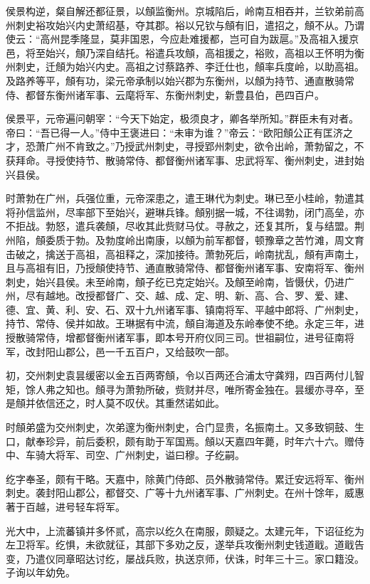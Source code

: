 \documentclass[]{article}
\begin{document}
侯景构逆，粲自解还都征景，以頠监衡州。京城陷后，岭南互相吞并，兰钦弟前高州刺史裕攻始兴内史萧绍基，夺其郡。裕以兄钦与頠有旧，遣招之，頠不从。乃谓使云：``高州昆季隆显，莫非国恩，今应赴难援都，岂可自为跋扈。''及高祖入援京邑，将至始兴，頠乃深自结托。裕遣兵攻頠，高祖援之，裕败，高祖以王怀明为衡州刺史，迁頠为始兴内史。高祖之讨蔡路养、李迁仕也，頠率兵度岭，以助高祖。及路养等平，頠有功，梁元帝承制以始兴郡为东衡州，以頠为持节、通直散骑常侍、都督东衡州诸军事、云麾将军、东衡州刺史，新豊县伯，邑四百户。

侯景平，元帝遍问朝宰：``今天下始定，极须良才，卿各举所知。''群臣未有对者。帝曰：``吾已得一人。''侍中王褒进曰：``未审为谁？''帝云：``欧阳頠公正有匡济之才，恐萧广州不肯致之。''乃授武州刺史，寻授郢州刺史，欲令出岭，萧勃留之，不获拜命。寻授使持节、散骑常侍、都督衡州诸军事、忠武将军、衡州刺史，进封始兴县侯。

时萧勃在广州，兵强位重，元帝深患之，遣王琳代为刺史。琳已至小桂岭，勃遣其将孙信监州，尽率部下至始兴，避琳兵锋。頠别据一城，不往谒勃，闭门高垒，亦不拒战。勃怒，遣兵袭頠，尽收其此赀财马仗。寻赦之，还复其所，复与结盟。荆州陷，頠委质于勃。及勃度岭出南康，以頠为前军都督，顿豫章之苦竹滩，周文育击破之，擒送于高祖，高祖释之，深加接待。萧勃死后，岭南扰乱，頠有声南土，且与高祖有旧，乃授頠使持节、通直散骑常侍、都督衡州诸军事、安南将军、衡州刺史，始兴县侯。未至岭南，頠子纥已克定始兴。及頠至岭南，皆慑伏，仍进广州，尽有越地。改授都督广、交、越、成、定、明、新、高、合、罗、爱、建、德、宜、黄、利、安、石、双十九州诸军事、镇南将军、平越中郎将、广州刺史，持节、常侍、侯并如故。王琳据有中流，頠自海道及东岭奉使不绝。永定三年，进授散骑常侍，增都督衡州诸军事，即本号开府仪同三司。世祖嗣位，进号征南将军，改封阳山郡公，邑一千五百户，又给鼓吹一部。

初，交州刺史袁昙缓密以金五百两寄頠，令以百两还合浦太守龚翙，四百两付儿智矩，馀人弗之知也。頠寻为萧勃所破，赀财并尽，唯所寄金独在。昙缓亦寻卒，至是頠并依信还之，时人莫不叹伏。其重然诺如此。

时頠弟盛为交州刺史，次弟邃为衡州刺史，合门显贵，名振南土。又多致铜鼓、生口，献奉珍异，前后委积，颇有助于军国焉。頠以天嘉四年薨，时年六十六。赠侍中、车骑大将军、司空、广州刺史，谥曰穆。子纥嗣。

纥字奉圣，颇有干略。天嘉中，除黄门侍郎、员外散骑常侍。累迁安远将军、衡州刺史。袭封阳山郡公，都督交、广等十九州诸军事、广州刺史。在州十馀年，威惠著于百越，进号轻车将军。

光大中，上流蕃镇并多怀贰，高宗以纥久在南服，颇疑之。太建元年，下诏征纥为左卫将军。纥惧，未欲就征，其部下多劝之反，遂举兵攻衡州刺史钱道戢。道戢告变，乃遣仪同章昭达讨纥，屡战兵败，执送京师，伏诛，时年三十三。家口籍没。子询以年幼免。
\end{document}
